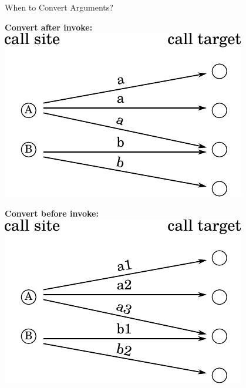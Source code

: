 \documentclass[xcolor=dvipsname]{beamer} %
\begin{document}
\begin{frame}{When to Convert Arguments?}
\begin{minipage}{0.49\textwidth}
\begin{table}
\centering
\textbf{Convert after invoke:} \newline \newline
\includegraphics[width=0.8\textwidth]{pic_regular.pdf}
\end{table}
\end{minipage} %
\begin{minipage}{0.49\textwidth}
\begin{table}
\centering
\textbf{Convert before invoke:} \newline \newline
\includegraphics[width=0.8\textwidth]{pic_calltarget.pdf}
\end{table}
\end{minipage}
\end{frame}
\end{document}
